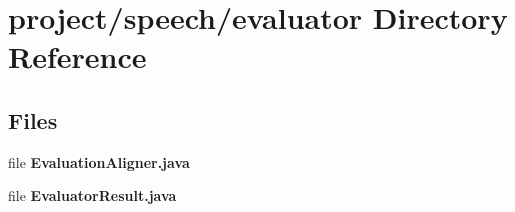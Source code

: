 \section{project/speech/evaluator Directory Reference}
\label{dir_d68846990b0b7aad0734fea5e49af333}
\subsection*{Files}
\begin{DoxyCompactItemize}
\item 
file {\bfseries Evaluation\+Aligner.\+java}
\item 
file {\bfseries Evaluator\+Result.\+java}
\end{DoxyCompactItemize}
